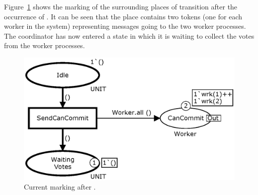 
Figure~\ref{fig:sendcancommit} shows the marking of the surrounding
places of transition  after the occurrence of
. It can be seen that the place
 contains two tokens (one for each worker in the
system) representing messages going to the two worker processes. The
coordinator has now entered a state in which it is waiting to collect
the votes from the worker processes.

\begin{figure}[b]
\centering
\includegraphics[scale=.45]{figures/SendCanCommit.eps}
\caption{Current marking after .}
\label{fig:sendcancommit}
\end{figure}





